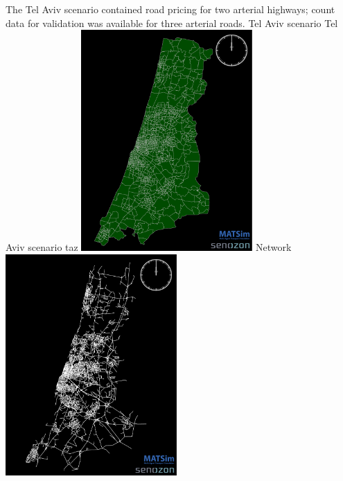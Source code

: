 The Tel Aviv scenario contained road pricing for two arterial highways; count data for validation was available for three arterial roads.
%
\createfigure%
{Tel Aviv scenario}%
{Tel Aviv scenario}%
{\label{fig:telavivscenario}}%
{%
  \createsubfigure%
  {\protect\gls{taz}}%
  {\includegraphics[width=0.49\textwidth,angle=0]{using/figures/TelAviv_TAZ}}%
  {\label{fig:TAZ}}%
  {}%
  \createsubfigure%
  {Network}%
	{\includegraphics[width=0.49\textwidth,angle=0]{using/figures/TelAviv_RoadNetwork}}%
  {\label{fig:network}}%
  {}%
}%
{}

